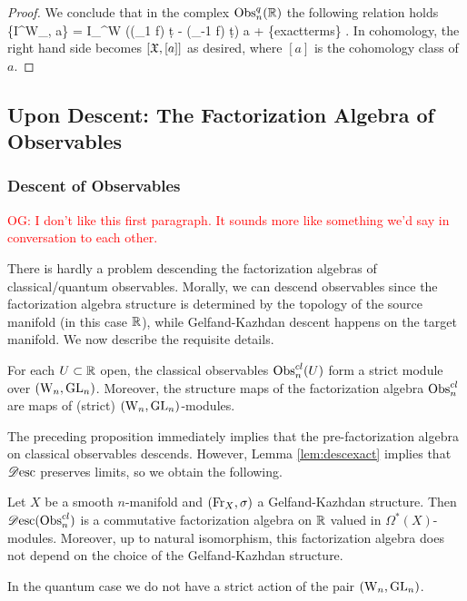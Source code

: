 \documentclass[10pt]{amsart}
\def\owen{\textcolor{red}{OG: }\textcolor{red}}
\begin{document}
\begin{proof}
We conclude that in the complex ${\rm Obs}^q_n(\mathbb R)$ the following relation holds
\ben
\hbar \{I^{\rm W}_\fX , a\} = I_\fX^{\rm W} ((\tau_{1} f) \d t - (\tau_{-1} f) \d t) \cdot
a + \{{\rm exact\;terms}\} .
\een
In cohomology, the right hand side becomes $[\mathfrak X, [a] ]$ as desired,
where $[a]$ is the cohomology class of $a$. 
\end{proof}


\subsection{Upon Descent: The Factorization Algebra of Observables}


\subsubsection{Descent of Observables}

\owen{I don't like this first paragraph. It sounds more like something we'd say in conversation to each other.}

There is hardly a problem descending the factorization algebras of classical/quantum observables. Morally, we can descend observables since the factorization algebra structure is determined by the topology of the source manifold (in this case $\mathbb R$), while Gelfand-Kazhdan descent happens on the target manifold.  We now describe the requisite details.

\begin{prop} 
For each $U \subset \mathbb R$ open, the classical observables ${\rm Obs}^{cl}_n (U)$ form a strict module over $({{\rm W}_n} , {\rm GL}_n)$. Moreover, the structure maps of the factorization algebra ${\rm Obs}^{cl}_n$ are maps of (strict) $({{\rm W}_n}, {\rm GL}_n)$-modules.
\end{prop}

The preceding proposition immediately implies that the pre-factorization algebra on classical observables descends. However, Lemma \ref{lem:descexact} implies that $\mathscr{D}{\rm esc}$ preserves limits, so we obtain the following.

\begin{cor}
Let $X$ be a smooth $n$-manifold and $({\rm Fr}_X , \sigma)$ a Gelfand-Kazhdan structure.  Then $\mathscr{D}{\rm esc}({\rm Obs}^{cl}_n)$ is a commutative factorization algebra on $\mathbb R$ valued in $\Omega^\ast (X)$-modules.  Moreover, up to natural isomorphism, this factorization algebra does not depend on the choice of the Gelfand-Kazhdan structure.
\end{cor}

In the quantum case we do not have a strict action of the pair
$({{\rm W}_n}, {\rm GL}_n)$. 
\end{document}
